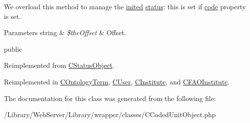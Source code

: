 We overload this method to manage the \hyperlink{class_c_status_object_a8429102e4f52f7558649b64f4e673a69}{inited} \hyperlink{}{status}\-: this is set if \hyperlink{}{code} property is set.


\begin{DoxyParams}[1]{Parameters}
string & {\em \$the\-Offset} & Offset.\\
\hline
\end{DoxyParams}
public 

Reimplemented from \hyperlink{class_c_status_object_ae733db1bbfffcbe894ea405765ab4150}{C\-Status\-Object}.



Reimplemented in \hyperlink{class_c_ontology_term_a622c31b9466e49a1413d38fda9ef9bb1}{C\-Ontology\-Term}, \hyperlink{class_c_user_aed8557e18a89d868cedf5a48328b33b2}{C\-User}, \hyperlink{class_c_institute_a8f82ded3b52a6fb609c67e45669e1454}{C\-Institute}, and \hyperlink{class_c_f_a_o_institute_a3bd7c59a3da53ba8c3cd1d9d0ff5ae0a}{C\-F\-A\-O\-Institute}.



The documentation for this class was generated from the following file\-:\begin{DoxyCompactItemize}
\item 
/\-Library/\-Web\-Server/\-Library/wrapper/classes/C\-Coded\-Unit\-Object.\-php\end{DoxyCompactItemize}

